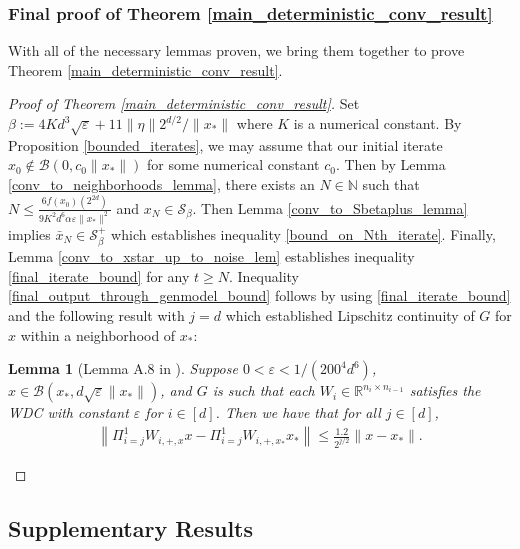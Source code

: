 \documentclass[11pt]{article}
\renewcommand{\epsilon}{\varepsilon}
\newcommand{\R}{\mathbb{R}}
\newcommand{\N}{\mathbb{N}}
\newcommand{\al}{\alpha}
\newcommand{\Seps}{\mathcal{S}}
\newcommand{\G}{G}
\newtheorem{lem}{Lemma}
\theoremstyle{remark}
\begin{document}
\subsubsection{Final proof of Theorem \ref{main_deterministic_conv_result}} \label{final_proof_subsection}

With all of the necessary lemmas proven, we bring them together to prove Theorem \ref{main_deterministic_conv_result}.

\begin{proof}[Proof of Theorem \ref{main_deterministic_conv_result}]

Set $\beta:= 4Kd^3\sqrt{\epsilon} + 11\|\eta\|2^{d/2}/\|x_*\|$ where $K$ is a numerical constant. By Proposition \ref{bounded_iterates}, we may assume that our initial iterate $x_0 \notin \mathcal{B}(0,c_0\|x_*\|)$ for some numerical constant $c_0$. Then by Lemma \ref{conv_to_neighborhoods_lemma}, there exists an $N \in \N$ such that $N \leqslant \frac{6f(x_0)(2^{2d})}{9K^2d^6 \al \epsilon \|x_*\|^2}$ and $x_N \in \Seps_{\beta}$. Then Lemma \ref{conv_to_Sbetaplus_lemma} implies $\bar{x}_N \in \Seps_{\beta}^+$ which establishes inequality \eqref{bound_on_Nth_iterate}. Finally, Lemma \ref{conv_to_xstar_up_to_noise_lem} establishes inequality \eqref{final_iterate_bound} for any $t \geqslant N$. Inequality \eqref{final_output_through_genmodel_bound} follows by using \eqref{final_iterate_bound} and the following result with $j=d$ which established Lipschitz continuity of $\G$ for $x$ within a neighborhood of $x_*$: \begin{lem}[Lemma A.8 in \cite{Huangetal2018}] \label{G_lipschitz}
Suppose $0 < \epsilon < 1/(200^4 d^6)$, $x \in \mathcal{B}(x_*,d\sqrt{\epsilon}\|x_*\|)$, and $\G$ is such that each $W_i \in \R^{n_i \times n_{i-1}}$ satisfies the WDC with constant $\epsilon$ for $i \in [d]$. Then we have that for all $j \in [d]$, \begin{align*}
    \left\| \Pi_{i=j}^1 W_{i,+,x}x - \Pi_{i=j}^1 W_{i,+,x_*}x_*\right\| \leqslant \frac{1.2}{2^{j/2}}\|x-x_*\|.
\end{align*}
\end{lem} \end{proof}



\subsection{Supplementary Results} \label{additional_results_sec}
\end{document}

